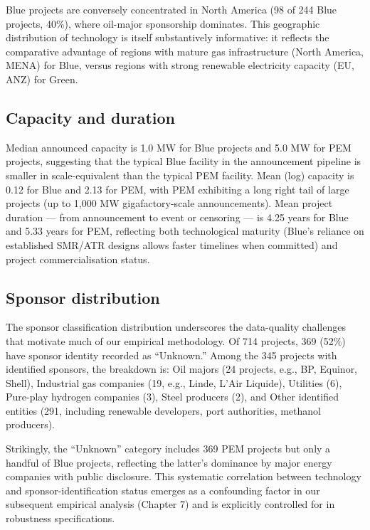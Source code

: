 \documentclass[11pt,a4paper]{article}
\begin{document}
Blue projects are conversely concentrated in North America (98 of 244 Blue projects, 40\%), where oil-major sponsorship dominates. This geographic distribution of technology is itself substantively informative: it reflects the comparative advantage of regions with mature gas infrastructure (North America, MENA) for Blue, versus regions with strong renewable electricity capacity (EU, ANZ) for Green.

\subsection{Capacity and duration}

Median announced capacity is 1.0 MW for Blue projects and 5.0 MW for PEM projects, suggesting that the typical Blue facility in the announcement pipeline is smaller in scale-equivalent than the typical PEM facility. Mean (log) capacity is 0.12 for Blue and 2.13 for PEM, with PEM exhibiting a long right tail of large projects (up to 1,000 MW gigafactory-scale announcements). Mean project duration --- from announcement to event or censoring --- is 4.25 years for Blue and 5.33 years for PEM, reflecting both technological maturity (Blue's reliance on established SMR/ATR designs allows faster timelines when committed) and project commercialisation status.

\subsection{Sponsor distribution}

The sponsor classification distribution underscores the data-quality challenges that motivate much of our empirical methodology. Of 714 projects, 369 (52\%) have sponsor identity recorded as ``Unknown.'' Among the 345 projects with identified sponsors, the breakdown is: Oil majors (24 projects, e.g., BP, Equinor, Shell), Industrial gas companies (19, e.g., Linde, L'Air Liquide), Utilities (6), Pure-play hydrogen companies (3), Steel producers (2), and Other identified entities (291, including renewable developers, port authorities, methanol producers).

Strikingly, the ``Unknown'' category includes 369 PEM projects but only a handful of Blue projects, reflecting the latter's dominance by major energy companies with public disclosure. This systematic correlation between technology and sponsor-identification status emerges as a confounding factor in our subsequent empirical analysis (Chapter 7) and is explicitly controlled for in robustness specifications.
\end{document}
